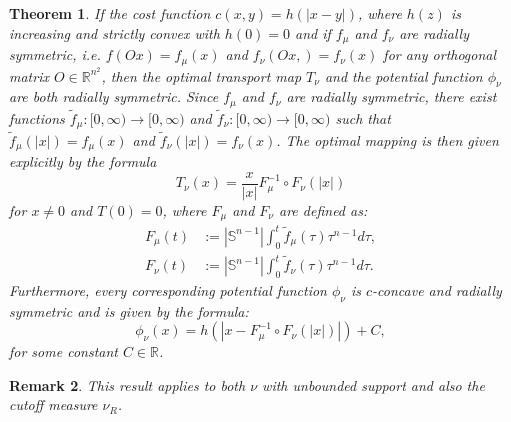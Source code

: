 \documentclass{amsart}
\newtheorem{theorem}{Theorem}
\theoremstyle{lemma}
\newtheorem{remark}[theorem]{Remark}
\theoremstyle{remark}
\begin{document}
\begin{theorem}\label{thm:radial}
If the cost function $c(x,y) = h(\left\vert x - y \right\vert)$, where $h(z)$ is increasing and strictly convex with $h(0) = 0$ and if $f_{\mu}$ and $f_{\nu}$ are radially symmetric, i.e. $f(Ox) = f_{\mu}(x)$ and $f_{\nu}(Ox,) = f_{\nu}(x)$ for any orthogonal matrix $O \in \mathbb{R}^{n^2}$, then the optimal transport map $T_{\nu}$ and the potential function $\phi_{\nu}$ are both radially symmetric. Since $f_{\mu}$ and $f_{\nu}$ are radially symmetric, there exist functions $\tilde{f}_{\mu} : [0, \infty) \rightarrow [0, \infty)$ and $\tilde{f}_{\nu}:[0, \infty) \rightarrow [0, \infty)$ such that $\tilde{f}_{\mu}(\vert x \vert) = f_{\mu}(x)$ and $\tilde{f}_{\nu}(\vert x \vert) = f_{\nu}(x)$. The optimal mapping is then given explicitly by the formula
\begin{equation}\label{eq:radialmapping}
T_{\nu}(x) = \frac{x}{\vert x \vert}F_{\mu}^{-1} \circ F_{\nu}(\vert x \vert)
\end{equation}
for $x \neq 0$ and $T(0) = 0$, where $F_{\mu}$ and $F_{\nu}$ are defined as:
\begin{align}
F_{\mu}(t) &:= \left\vert \mathbb{S}^{n-1} \right\vert \int_{0}^{t} \tilde{f}_{\mu}(\tau) \tau^{n-1}d\tau, \\
F_{\nu}(t) &:= \left\vert \mathbb{S}^{n-1} \right\vert \int_{0}^{t} \tilde{f}_{\nu}(\tau) \tau^{n-1}d\tau.
\end{align}
Furthermore, every corresponding potential function $\phi_{\nu}$ is $c$-concave and radially symmetric and is given by the formula:
\begin{equation}\label{eq:radialpot}
\phi_{\nu}(x) = h \left( \left\vert x  - F_{\mu}^{-1} \circ F_{\nu} (\vert x \vert) \right\vert \right) + C,
\end{equation}
for some constant $C \in \mathbb{R}$.
\end{theorem}

\begin{remark}
This result applies to both $\nu$ with unbounded support and also the cutoff measure $\nu_{R}$.
\end{remark}
\end{document}
